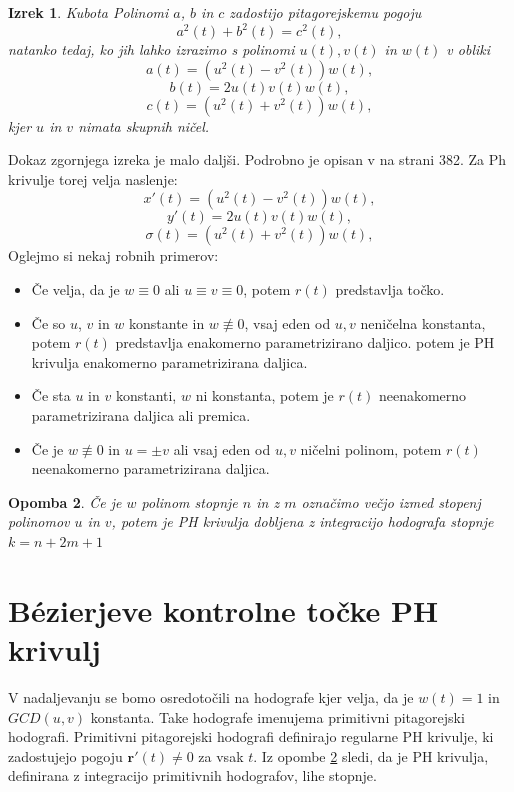 \documentclass[12pt]{article}
\newtheorem{Izrek}{{\sc Izrek}}[section]
\newtheorem{Opomba}[Izrek]{{\sc Opomba}}
\begin{document}
\begin{Izrek}{Kubota}\newline
	\label{Kubota}
	Polinomi $a$, $b$ in $c$ zadostijo pitagorejskemu pogoju
	$$a^2(t) + b^2(t) = c^2(t),$$
	natanko tedaj, ko jih lahko izrazimo s polinomi $u(t), v(t)$ in $w(t)$ v obliki
	$$a(t) = (u^2(t) - v^2(t))w(t),$$
	$$b(t) = 2u(t)v(t)w(t),$$
	$$c(t) = (u^2(t) + v^2(t))w(t),$$
	kjer $u$ in $v$ nimata skupnih ničel.
\end{Izrek}
Dokaz zgornjega izreka je malo daljši. Podrobno je opisan v  \cite{knjiga} na strani 382.
Za Ph krivulje torej velja naslenje:
$$x'(t) = (u^2(t) - v^2(t))w(t),$$
$$y'(t) = 2u(t)v(t)w(t),$$
$$\sigma(t) = (u^2(t) + v^2(t))w(t),$$
Oglejmo si nekaj robnih primerov:
\begin{itemize}
	\item Če velja, da je $w\equiv0$ ali $u\equiv v \equiv 0$, potem $r(t)$ predstavlja točko.
	\item Če so $u$, $v$ in $w$ konstante in $w \not\equiv 0$, vsaj eden od $u, v$ neničelna konstanta, potem $r(t)$ predstavlja enakomerno parametrizirano daljico.
	potem je PH krivulja enakomerno parametrizirana daljica.
	\item Če sta $u$ in $v$ konstanti, $w$  ni konstanta, potem je  $r(t)$ neenakomerno parametrizirana daljica ali premica.
	\item Če je $w \not\equiv 0$ in $u = \pm v$ ali vsaj eden od $u, v$ ničelni polinom, 
	potem $r(t)$ neenakomerno parametrizirana daljica.
\end{itemize}
\begin{Opomba}
	\label{Stopnja}
	Če je $w$ polinom stopnje $n$ in z $m$ označimo večjo izmed stopenj polinomov $u$ in $v$, 
potem je PH krivulja dobljena z integracijo hodografa stopnje $k = n + 2m + 1$
\end{Opomba}

\section{B\'ezierjeve kontrolne točke PH krivulj}
V nadaljevanju se bomo osredotočili na hodografe kjer velja, da je $w(t) = 1$ in $GCD(u,v)$ konstanta.
Take hodografe imenujema primitivni pitagorejski hodografi. 
Primitivni pitagorejski hodografi definirajo regularne PH krivulje, ki zadostujejo pogoju $\textbf{r}'(t) \neq 0$ za vsak $t$. 
Iz opombe \ref{Stopnja} sledi, da je PH krivulja, definirana z integracijo
primitivnih hodografov, lihe stopnje.
\end{document}
